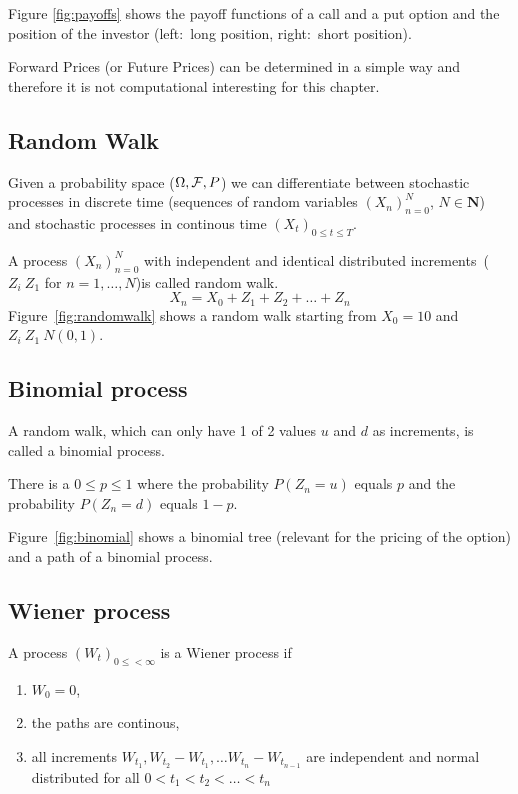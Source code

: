 Figure \ref{fig:payoffs} shows the payoff functions of a call and
a put option and the position of the investor (left:~long position,
right:~short position).



Forward Prices (or Future Prices) can be determined in a simple way
and therefore it is not computational interesting for this chapter.

\subsection{Random Walk}\label{sec:randomwalk}
Given a probability space ($\Omega,{\cal F},P$) we can differentiate
between stochastic processes in discrete time (sequences of random
variables $(X_n)_{n=0}^N$, $N \in\mathbf{N}$) and stochastic processes
in continous time $(X_t)_{0 \leq t \leq T}$.

A process $(X_n)_{n=0}^N$ with independent and identical distributed
increments~($Z_i ~ Z_1$ for $n=1,\ldots,N$)is called random walk.
$$ X_n = X_0 + Z_1 + Z_2 + \ldots + Z_n $$
Figure~\ref{fig:randomwalk} shows a random walk starting from $X_0 =
10$ and $Z_i ~ Z_1 ~ N(0,1)$.



\subsection{Binomial process}

A random walk, which can only have 1 of 2 values $u$ and $d$ as increments, is
called a binomial process.

There is a $0 \leq p \leq 1$ where the probability $P(Z_n = u)$ equals
$p$ and the probability $P(Z_n = d)$ equals $1 - p$.

Figure~\ref{fig:binomial} shows a binomial tree (relevant for the
pricing of the option) and a path of a binomial process. 



\subsection{Wiener process}

A process $(W_t)_{0 \leq < \infty}$ is a Wiener process if
\begin{enumerate}
\item $W_0 = 0$,
\item the paths are continous,
\item all increments $W_{t_1}, W_{t_2} - W_{t_1}, \ldots W_{t_n} - W_{t_{n-1}}$
  are independent and normal distributed for all $0 < t_1 < t_2 < \ldots < t_n$ 
\end{enumerate}


